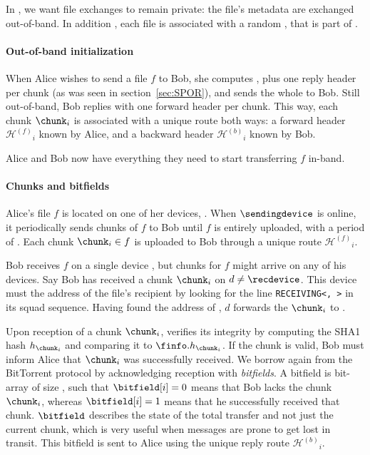 In \name, we want file exchanges to remain private: the file's metadata are exchanged out-of-band.
In addition , each file is associated with a random \fileid, that is part of \finfo.

\newcommand\forwardheader{\ensuremath{\mathcal{H}^{(f)}}}
\newcommand\backwardheader{\ensuremath{\mathcal{H}^{(b)}}}

\paragraph*{Out-of-band initialization} 
When Alice wishes to send a file $f$ to Bob, she computes \finfo, 
plus one reply header per chunk (as was seen in section~\ref{sec:SPOR}), and sends the whole to Bob.
Still out-of-band, Bob replies with one forward header per chunk.
This way, each chunk $\chunk_i$ is associated with a unique route both ways: 
a forward header $\forwardheader_i$ known by Alice, and a backward header $\backwardheader_i$ known by Bob.

Alice and Bob now have everything they need to start transferring $f$ in-band.


\paragraph*{Chunks and bitfields}
Alice's file $f$ is located on one of her devices, \sendingdevice. 
When $\sendingdevice$ is online, it periodically sends chunks of $f$ to Bob until $f$ is entirely uploaded, with a period of \tupload.
Each chunk $\chunk_i \in f$ is uploaded to Bob through a unique route $\forwardheader_i$.

Bob receives $f$ on a single device \recdevice, but chunks for $f$ might arrive on any of his devices.
Say Bob has received a chunk $\chunk_i$ on $d \neq \recdevice$.
This device must the address of the file's recipient \recdevice by looking for the line \texttt{RECEIVING<\recdevice, \fileid>} in its squad sequence.
Having found the address of \recdevice, $d$ forwards the $\chunk_i$ to \recdevice.

Upon reception of a chunk $\chunk_i$, \recdevice verifies its integrity by computing the SHA1 hash $h_{\chunk_i}$ and comparing it to $\finfo.h_{\chunk_i}$.
If the chunk is valid, Bob must inform Alice that $\chunk_i$ was successfully received.
We borrow again from the BitTorrent protocol by acknowledging reception with \emph{bitfields}.
A bitfield \bitfield is bit-array of size \nchunks, such that $\bitfield[i] = 0$ means that Bob lacks the chunk $\chunk_i$, whereas $\bitfield[i] = 1$ means that he successfully received that chunk.
$\bitfield$ describes the state of the total transfer and not just the current chunk, which is very useful when messages are prone to get lost in transit. 
This bitfield is sent to Alice using the unique reply route $\backwardheader_i$.


